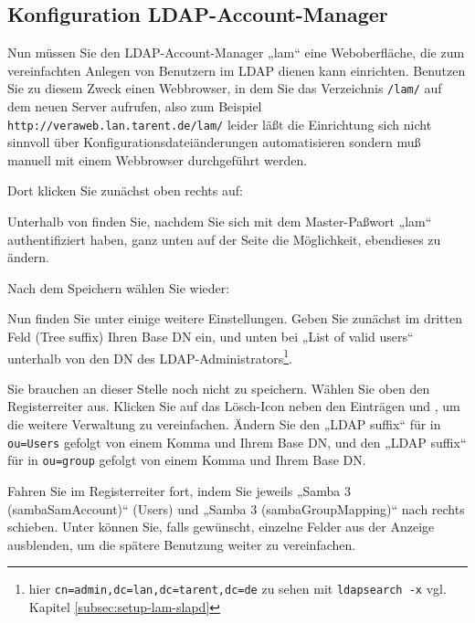 \subsection{Konfiguration LDAP-Account-Manager}\label{subsec:setup-lam-cfg}

Nun müssen Sie den LDAP-Account-Manager „lam“ \dash eine Weboberfläche,
die zum vereinfachten Anlegen von Benutzern im LDAP dienen kann \dash
einrichten. Benutzen Sie zu diesem Zweck einen Webbrowser, in dem Sie
das Verzeichnis \texttt{/lam/} auf dem neuen Server aufrufen, also zum
Beispiel \texttt{http://veraweb.lan.tarent.de/lam/} \dash leider läßt
die Einrichtung sich nicht sinnvoll über Konfigurationsdateiänderungen
automatisieren sondern muß manuell mit einem Webbrowser durchgeführt
werden.

Dort klicken Sie zunächst oben rechts auf:

Unterhalb von  finden
Sie, nachdem Sie sich mit dem Master-Paßwort „lam“ authentifiziert
haben, ganz unten auf der Seite die Möglichkeit, ebendieses zu ändern.

Nach dem Speichern wählen Sie wieder:

Nun finden Sie unter 
einige weitere Einstellungen. Geben Sie zunächst im dritten Feld
(Tree suffix) Ihren Base DN ein, und unten bei „List of valid users“
unterhalb von  den DN
des LDAP-Administrators\Hair\footnote{hier
\texttt{cn=admin,dc=lan,dc=tarent,dc=de} \dash zu sehen mit
\texttt{ldapsearch -x} \dash vgl. Kapitel \ref{subsec:setup-lam-slapd}}.

Sie brauchen an dieser Stelle noch nicht zu speichern. Wählen Sie oben
den Registerreiter  aus. Klicken
Sie auf das Lösch-Icon  neben den Einträgen
 und , um die weitere Verwaltung zu vereinfachen. Ändern Sie
den „LDAP suffix“ für  in \texttt{ou=Users}
gefolgt von einem Komma und Ihrem Base DN, und den „LDAP suffix“ für
 in \texttt{ou=group} gefolgt von einem
Komma und Ihrem Base DN.

Fahren Sie im Registerreiter  fort,
indem Sie jeweils „Samba 3 (sambaSamAccount)“ (Users) und „Samba 3
(sambaGroupMapping)“ nach  rechts schieben.
Unter  können Sie, falls
gewünscht, einzelne Felder aus der Anzeige ausblenden, um die spätere
Benutzung weiter zu vereinfachen.

